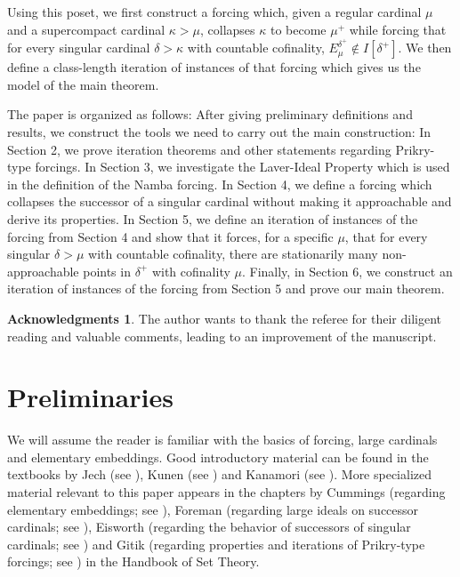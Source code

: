 \documentclass[a4paper]{amsart}
\theoremstyle{definition}
\newtheorem*{myack}{Acknowledgments}
\theoremstyle{remark}
\theoremstyle{plain}
\numberwithin{mydef}{section}
\begin{document}
	Using this poset, we first construct a forcing which, given a regular cardinal $\mu$ and a supercompact cardinal $\kappa>\mu$, collapses $\kappa$ to become $\mu^+$ while forcing that for every singular cardinal $\delta>\kappa$ with countable cofinality, $E_{\mu}^{\delta^+}\notin I[\delta^+]$. We then define a class-length iteration of instances of that forcing which gives us the model of the main theorem.
	
	The paper is organized as follows: After giving preliminary definitions and results, we construct the tools we need to carry out the main construction: In Section 2, we prove iteration theorems and other statements regarding Prikry-type forcings. In Section 3, we investigate the Laver-Ideal Property which is used in the definition of the Namba forcing. In Section 4, we define a forcing which collapses the successor of a singular cardinal without making it approachable and derive its properties. In Section 5, we define an iteration of instances of the forcing from Section 4 and show that it forces, for a specific $\mu$, that for every singular $\delta>\mu$ with countable cofinality, there are stationarily many non-approachable points in $\delta^+$ with cofinality $\mu$. Finally, in Section 6, we construct an iteration of instances of the forcing from Section 5 and prove our main theorem.
	
	\begin{myack}
		The author wants to thank the referee for their diligent reading and valuable comments, leading to an improvement of the manuscript.
	\end{myack}
	
	\section{Preliminaries}
		
	We will assume the reader is familiar with the basics of forcing, large cardinals and elementary embeddings. Good introductory material can be found in the textbooks by Jech (see \cite{JechSetTheory}), Kunen (see \cite{KunenSetTheory}) and Kanamori (see \cite{KanamoriHigherInfinite}). More specialized material relevant to this paper appears in the chapters by Cummings (regarding elementary embeddings; see \cite{CummingsHandbook}), Foreman (regarding large ideals on successor cardinals; see \cite{ForemanChapter}), Eisworth (regarding the behavior of successors of singular cardinals; see \cite{EisworthHandbook}) and Gitik (regarding properties and iterations of Prikry-type forcings; see \cite{GitikHandbook}) in the Handbook of Set Theory.
	
\end{document}
